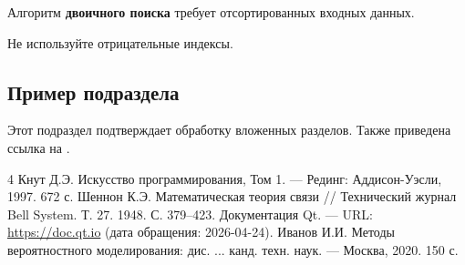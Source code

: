 \documentclass[14pt,a4paper]{extarticle}
\begin{document}
\begin{tcolorbox}[colback=blue!5!white, colframe=blue!50!black, title=Важно]
Алгоритм \textbf{двоичного поиска} требует отсортированных входных данных.
\end{tcolorbox}

\begin{tcolorbox}[colback=red!5!white, colframe=red!60!black, title=Предупреждение]
Не используйте отрицательные индексы.
\end{tcolorbox}

\subsection{Пример подраздела}

Этот подраздел подтверждает обработку вложенных разделов. Также приведена ссылка на \cite{ref.ivanov}.



\begin{thebibliography}{4}
  Кнут Д.Э. Искусство программирования, Том 1. --- Рединг: Аддисон-Уэсли, 1997. 672 с.
  Шеннон К.Э. Математическая теория связи // Технический журнал Bell System. Т. 27. 1948. С. 379–423.
  Документация Qt. --- URL: \url{https://doc.qt.io} (дата обращения: 2026-04-24).
  Иванов И.И. Методы вероятностного моделирования: дис. ... канд. техн. наук. --- Москва, 2020. 150 с.
\end{thebibliography}
\end{document}
